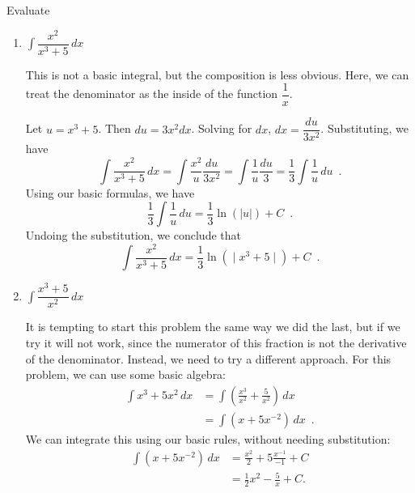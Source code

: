 \begin{example}
Evaluate
  \begin{enumerate}[label=(\alph*)]
    \item $\int \dfrac{x^2}{x^3+5}\,dx$
    \begin{solution}
      This is not a basic integral, but the composition is less obvious. Here, we can treat the denominator as the inside of the function $\dfrac{1}{x}$.

      Let $u=x^3+5$. Then $du=3x^2dx$. Solving for $dx$, $dx = \dfrac{du}{3x^2}$. Substituting, we have
      $$\int \frac{x^2}{x^3+5}\,dx = \int \frac{x^2}{u} \frac{du}{3x^2} = \int \frac{1}{u} \frac{du}{3} = \frac{1}{3} \int \frac{1}{u} \, du \enspace . $$
      Using our basic formulas, we have
      $$\frac{1}{3}\int \frac{1}{u}\,du = \frac{1}{3}\ln(|u|) + C \enspace .$$
      Undoing the substitution, we conclude that
      $$\int \frac{x^2}{x^3+5}\,dx = \frac{1}{3}\ln(∣x^3+5∣)+C \enspace .$$
    \end{solution}
    \item $\int \dfrac{x^3+5}{x^2}\,dx$
    \begin{solution}
      It is tempting to start this problem the same way we did the last, but if we try it will not work, since the numerator of this fraction is not the derivative of the denominator. Instead, we need to try a different approach. For this problem, we can use some basic algebra:
      \begin{align*}
      \int {x^3+5}{x^2}\,dx &= \int \left(\frac{x^3}{x^2} + \frac{5}{x^2}\right)\,dx \\
        &= \int \left(x+5x^{-2}\right)\,dx \enspace.
      \end{align*}
      We can integrate this using our basic rules, without needing substitution:
      \begin{align*}
      \int \left(x+5x^{-2}\right)\,dx &= \frac{x^2}{2} + 5\frac{x^{-1}}{-1} + C\\
        &= \frac{1}{2}x^2 - \frac{5}{x} + C.
      \end{align*}
      \end{solution}
  \end{enumerate}

\end{example}

